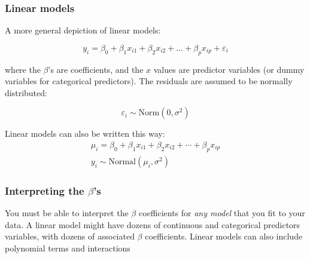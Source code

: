 \documentclass[color=usenames,dvipsnames]{beamer}\usepackage[]{graphicx}\usepackage[]{color}
\begin{document}
\begin{frame}
  \frametitle{Linear models}
    A more general depiction of linear models:

\[
y_i = \beta_0 + \beta_1 x_{i1} + \beta_2 x_{i2} + \ldots + \beta_p x_{ip} + \varepsilon_i
\]

where the $\beta$'s are coefficients, and the $x$ values are predictor
variables (or dummy variables for categorical predictors). %
The residuals are assumed to be normally distributed:

\[
  \varepsilon_i \sim \mathrm{Norm}(0, \sigma^2)
\]

\pause

\vfill %



Linear models can also be written this way:
\begin{gather*}
  \mu_i = \beta_0 + \beta_1 x_{i1} + \beta_2 x_{i2} + \cdots + \beta_p x_{ip} \\
  y_i \sim \mathrm{Normal}(\mu_i, \sigma^2)
\end{gather*}

\end{frame}




\begin{frame}
  \frametitle{Interpreting the $\beta$'s}
You must be able to interpret the $\beta$
coefficients for {\it any model} that you fit to your data.
\pause
\vfill
A linear model might have dozens of continuous and categorical
predictors variables, with dozens of associated $\beta$ coefficients.
\pause
\vfill
Linear models can also include polynomial terms and interactions
\end{frame}
\end{document}
